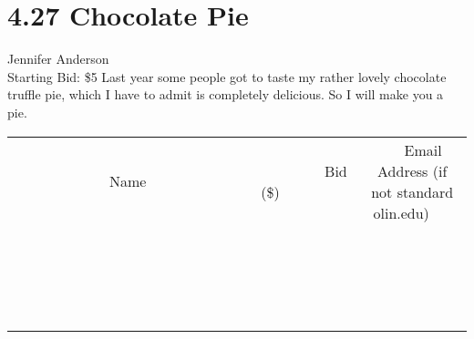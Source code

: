 \documentclass[11pt]{article}
\begin{document}
\section*{4.27 Chocolate Pie}
Jennifer Anderson
\\
Starting Bid: \$5
\newline
Last year some people got to taste my rather lovely chocolate truffle pie, which I have to admit is completely delicious. So I will make you a pie.
\\[3ex]
\begin{tabular}{c c c}
~~~~~~~~~~~~~Name~~~~~~~~~~~~~ & ~~~~~~~~~Bid (\$)~~~~~~~~~  & ~~~Email Address (if not standard olin.edu)~~~\\
 & & \\
\hline
 & & \\
\hline
 & & \\
\hline
 & & \\
\hline
 & & \\
\hline
 & & \\
\hline
 & & \\
\hline
 & & \\
\hline
 & & \\
\hline
 & & \\
\hline
 & & \\
\hline
 & & \\
\hline
 & & \\
\hline
 & & \\
\hline
 & & \\
\hline
 & & \\
\hline
 & & \\
\hline
 & & \\
\hline
 & & \\
\hline
\end{tabular}
\newpage
\end{document}

